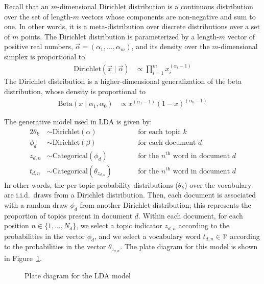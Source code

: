 \documentclass{article}
\newcommand{\nth}{^{\text{th}}}
\begin{document}
Recall that an $m$-dimensional Dirichlet distribution is a continuous distribution over the set of length-$m$ vectors whose components are non-negative and sum to one.
In other words, it is a meta-distribution over discrete distributions over a set of $m$ points.
The Dirichlet distribution is parameterized by a length-$m$ vector of positive real numbers, $\vec \alpha = (\alpha_1, \ldots, \alpha_m)$, and its density over the $m$-dimensional simplex is proportional to
\begin{align}
\text{Dirichlet}(\vec x \mid \vec \alpha) &\propto \prod_{i=1}^m x_i^{(\alpha_i-1)}
\end{align}
The Dirichlet distribution is a higher-dimensional generalization of the beta distribution, whose density is proportional to
\begin{align}
\text{Beta}(x \mid \alpha_1, \alpha_0) &\propto x^{(\alpha_1-1)} (1-x)^{(\alpha_0-1)}
\end{align}

The generative model used in LDA is given by:
\begin{alignat}{2}
\theta_k &\sim \text{Dirichlet}(\alpha) &\qquad&\text{for each topic $k$} \\
\phi_d &\sim \text{Dirichlet}(\beta) &\qquad&\text{for each document $d$} \\
z_{d,n} &\sim \text{Categorical}(\phi_d) &\qquad&\text{for the $n\nth$ word in document $d$} \\
t_{d,n} &\sim \text{Categorical}(\theta_{z_{d,n}}) &\qquad&\text{for the $n\nth$ word in document $d$}
\end{alignat}
In other words, the per-topic probability distributions ($\theta_k$) over the vocabulary are i.i.d.\ draws from a Dirichlet distribution.
Then, each document is associated with a random draw $\phi_d$ from another Dirichlet distribution; this represents the proportion of topics present in document $d$.
Within each document, for each position $n \in \{1, \ldots, N_d\}$, we select a topic indicator $z_{d,n}$ according to the probabilities in the vector $\phi_d$, and we select a vocabulary word $t_{d,n} \in \mathcal V$ according to the probabilities in the vector $\theta_{z_{d,n}}$.
The plate diagram for this model is shown in Figure~\ref{fig:plate-lda}.

\begin{figure}[htb]
%
\centering
{}
%
\caption{Plate diagram for the LDA model}
\label{fig:plate-lda}
\end{figure}
\end{document}
